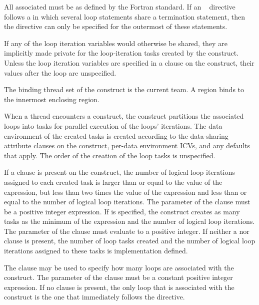 All associated  must be  as defined by the Fortran standard. If an ~ directive follows a  in which several loop statements share a  termination statement, then the directive can only be specified for the outermost of these  statements.

If any of the loop iteration variables would otherwise be shared, they are implicitly made private for the loop-iteration tasks created by the  construct. Unless the loop iteration variables are specified in a  clause on the  construct, their values after the loop are unspecified.
\fortranspecificend

\binding
The binding thread set of the  construct is the current team. A  region binds to the innermost enclosing  region.

\descr
When a thread encounters a  construct, the construct partitions the associated loops into tasks for parallel execution of the loops' iterations. The data environment of the created tasks is created according to the data-sharing attribute clauses on the  construct, per-data environment ICVs, and any defaults that apply. The order of the creation of the loop tasks is unspecified.

If a  clause is present on the  construct, the number of logical loop iterations assigned to each created task is larger than or equal to the value of the  expression, but less than two times the value of the  expression and less than or equal to the number of logical loop iterations. The parameter of the  clause must be a positive integer expression. If  is specified, the  construct creates as many tasks as the minimum of the  expression and the number of logical loop iterations. The parameter of the  clause must evaluate to a positive integer.  If neither a  nor  clause is present, the number of loop tasks created and the number of logical loop iterations assigned to these tasks is implementation defined.

The  clause may be used to specify how many loops are associated with the  construct. The parameter of the  clause must be a constant positive integer expression. If no  clause is present, the only loop that is associated with the  construct is the one that immediately follows the  directive.

